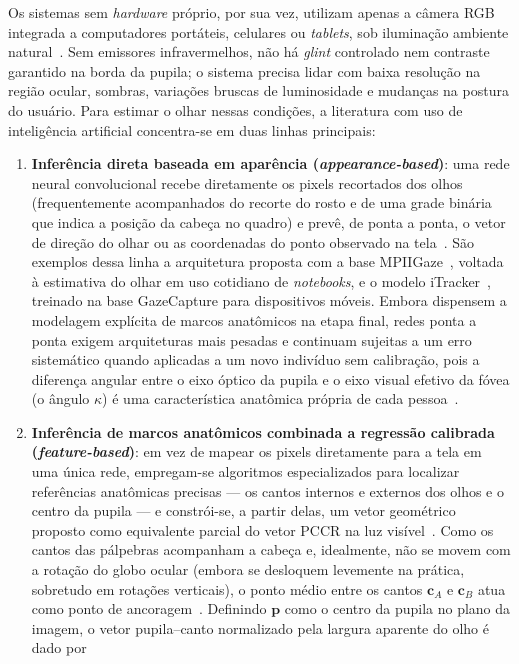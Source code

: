 Os sistemas sem \textit{hardware} próprio, por sua vez, utilizam apenas a câmera RGB integrada a computadores portáteis, celulares ou \textit{tablets}, sob iluminação ambiente natural~\cite{hansen2010in,zhang2015mpiigaze}. Sem emissores infravermelhos, não há \textit{glint} controlado nem contraste garantido na borda da pupila; o sistema precisa lidar com baixa resolução na região ocular, sombras, variações bruscas de luminosidade e mudanças na postura do usuário. Para estimar o olhar nessas condições, a literatura com uso de inteligência artificial concentra-se em duas linhas principais:

\begin{enumerate}
    \item \textbf{Inferência direta baseada em aparência (\textit{appearance-based})}: uma rede neural convolucional recebe diretamente os pixels recortados dos olhos (frequentemente acompanhados do recorte do rosto e de uma grade binária que indica a posição da cabeça no quadro) e prevê, de ponta a ponta, o vetor de direção do olhar ou as coordenadas do ponto observado na tela~\cite{zhang2015mpiigaze,krafka2016eye}. São exemplos dessa linha a arquitetura proposta com a base MPIIGaze~\cite{zhang2015mpiigaze}, voltada à estimativa do olhar em uso cotidiano de \textit{notebooks}, e o modelo iTracker~\cite{krafka2016eye}, treinado na base GazeCapture para dispositivos móveis. Embora dispensem a modelagem explícita de marcos anatômicos na etapa final, redes ponta a ponta exigem arquiteturas mais pesadas e continuam sujeitas a um erro sistemático quando aplicadas a um novo indivíduo sem calibração, pois a diferença angular entre o eixo óptico da pupila e o eixo visual efetivo da fóvea (o ângulo $\kappa$) é uma característica anatômica própria de cada pessoa~\cite{guestrin2006general,krafka2016eye}.
    \item \textbf{Inferência de marcos anatômicos combinada a regressão calibrada (\textit{feature-based})}: em vez de mapear os pixels diretamente para a tela em uma única rede, empregam-se algoritmos especializados para localizar referências anatômicas precisas --- os cantos internos e externos dos olhos e o centro da pupila --- e constrói-se, a partir delas, um vetor geométrico proposto como equivalente parcial do vetor PCCR na luz visível~\cite{sesma2012evaluation}. Como os cantos das pálpebras acompanham a cabeça e, idealmente, não se movem com a rotação do globo ocular (embora se desloquem levemente na prática, sobretudo em rotações verticais), o ponto médio entre os cantos $\mathbf{c}_A$ e $\mathbf{c}_B$ atua como ponto de ancoragem~\cite{sesma2012evaluation}. Definindo $\mathbf{p}$ como o centro da pupila no plano da imagem, o vetor pupila--canto normalizado pela largura aparente do olho é dado por

\end{enumerate}
